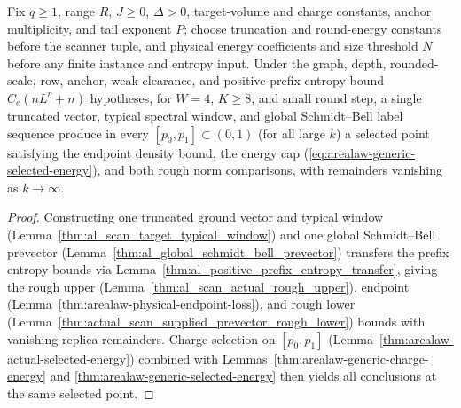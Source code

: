 \begin{lemma}
    \label{thm:arealaw-source-rough-comparison}
    \leanok
    Fix $q\geq1$, range $R$, $J\geq0$, $\Delta>0$, target-volume and charge constants,
    anchor multiplicity, and tail exponent $P$; choose truncation and round-energy constants
    before the scanner tuple, and physical energy coefficients and size threshold $N$ before
    any finite instance and entropy input. Under the graph, depth, rounded-scale, row, anchor,
    weak-clearance, and positive-prefix entropy bound $C_e(nL^\eta+n)$ hypotheses, for
    $W=4$, $K\geq8$, and small round step, a single truncated vector, typical spectral window,
    and global Schmidt--Bell label sequence produce in every $[p_0,p_1]\subset(0,1)$ (for all large $k$)
    a selected point satisfying the endpoint density bound, the energy cap (\ref{eq:arealaw-generic-selected-energy}),
    and both rough norm comparisons, with remainders vanishing as $k\to\infty$.
\end{lemma}
\begin{proof}
    \leanok
    Constructing one truncated ground vector and typical window
    (Lemma~\ref{thm:al_scan_target_typical_window}) and one global Schmidt--Bell prevector
    (Lemma~\ref{thm:al_global_schmidt_bell_prevector}) transfers the prefix entropy bounds via
    Lemma~\ref{thm:al_positive_prefix_entropy_transfer}, giving the rough upper
    (Lemma~\ref{thm:al_scan_actual_rough_upper}), endpoint (Lemma~\ref{thm:arealaw-physical-endpoint-loss}),
    and rough lower (Lemma~\ref{thm:actual_scan_supplied_prevector_rough_lower}) bounds with vanishing
    replica remainders. Charge selection on $[p_0,p_1]$ (Lemma~\ref{thm:arealaw-actual-selected-energy})
    combined with Lemmas~\ref{thm:arealaw-generic-charge-energy} and \ref{thm:arealaw-generic-selected-energy}
    then yields all conclusions at the same selected point.
\end{proof}


